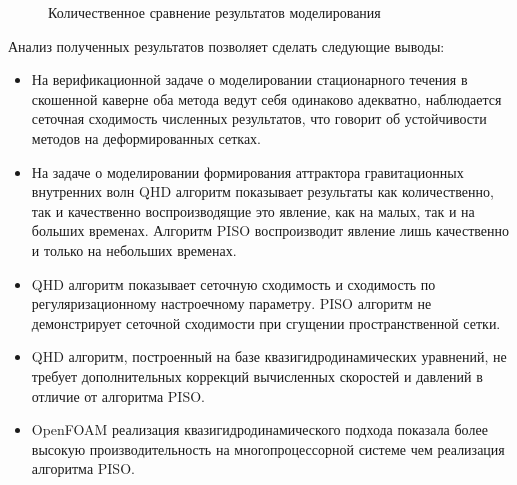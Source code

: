 \documentclass[utf8x]{G7-32} %
\begin{document}
\begin{figure}[hbt!]
    \centering
        
    \caption{Количественное сравнение результатов моделирования}
    \label{fig:AdamsBashforthEulerNek3D}
\end{figure}

Анализ полученных результатов позволяет сделать следующие выводы:
\begin{itemize}
    \item На верификационной задаче о моделировании стационарного течения в скошенной каверне оба метода ведут себя одинаково адекватно, наблюдается сеточная сходимость численных результатов, что говорит об устойчивости методов на деформированных сетках.
    \item На задаче о моделировании формирования аттрактора гравитационных внутренних волн QHD алгоритм показывает результаты как количественно, так и качественно воспроизводящие это явление, как на малых, так и на больших временах. Алгоритм PISO воспроизводит явление лишь качественно и только на небольших временах.
    \item QHD алгоритм показывает сеточную сходимость и сходимость по регуляризационному настроечному параметру. PISO алгоритм не демонстрирует сеточной сходимости при сгущении пространственной сетки.
    \item QHD алгоритм, построенный на базе квазигидродинамических уравнений, не требует дополнительных коррекций вычисленных скоростей и давлений в отличие от алгоритма PISO.
    \item OpenFOAM реализация квазигидродинамического подхода показала более высокую производительность на многопроцессорной системе чем реализация алгоритма PISO.
\end{itemize}
\end{document}
